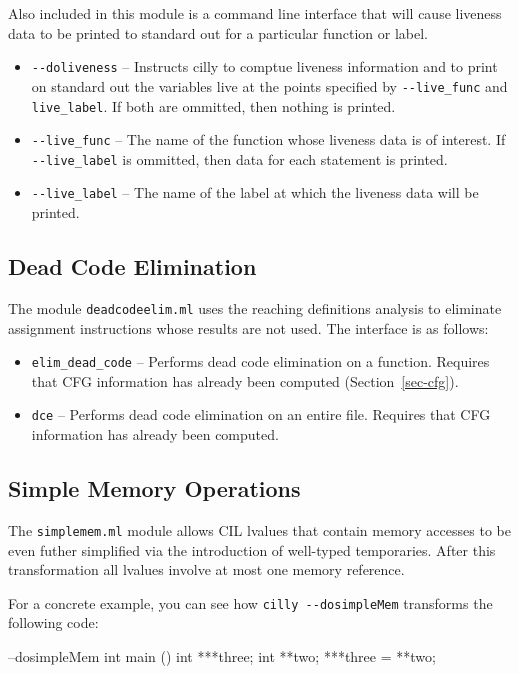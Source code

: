 \documentclass{article}
\def\secref#1{Section~\ref{sec-#1}}
\def\t#1{{\tt #1}}
\begin{document}
Also included in this module is a command line interface that
will cause liveness data to be printed to standard out for
a particular function or label.

\begin{itemize}
\item \t{-{}-doliveness} -- Instructs cilly to comptue liveness
information and to print on standard out the variables live
at the points specified by \t{-{}-live\_func} and \t{live\_label}.
If both are ommitted, then nothing is printed.
\item \t{-{}-live\_func} -- The name of the function whose
liveness data is of interest. If \t{-{}-live\_label} is ommitted,
then data for each statement is printed.
\item \t{-{}-live\_label} -- The name of the label at which
the liveness data will be printed.
\end{itemize}

\subsection{Dead Code Elimination}

The module \t{deadcodeelim.ml} uses the reaching definitions
analysis to eliminate assignment instructions whose results
are not used. The interface is as follows:

\begin{itemize}
\item \t{elim\_dead\_code} -- Performs dead code elimination
on a function. Requires that CFG information has already
been computed (\secref{cfg}).
\item \t{dce} -- Performs dead code elimination on an
entire file. Requires that CFG information has already
been computed.
\end{itemize}

\subsection{Simple Memory Operations} 

The \t{simplemem.ml} module allows CIL lvalues that contain memory
accesses to be even futher simplified via the introduction of
well-typed temporaries. After this transformation all lvalues involve
at most one memory reference.

For a concrete example, you can see how \t{cilly -{}-dosimpleMem} 
transforms the following code:

\begin{cilcode}[global] --dosimpleMem
  int main () {
    int ***three;
    int **two;
    ***three = **two; 
  } 
\end{cilcode}
\end{document}

